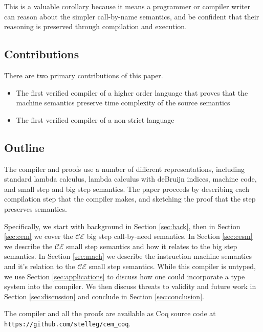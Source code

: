 This is a valuable corollary because it means a programmer or compiler writer
can reason about the simpler call-by-name semantics, and be confident that their
reasoning is preserved through compilation and execution.

\subsection{Contributions}
There are two primary contributions of this paper. 
\begin{itemize}
\item The first verified compiler of a higher order language that proves that
the machine semantics preserve time complexity of the source semantics
\item The first verified compiler of a non-strict language
\end{itemize}

\subsection{Outline}
The compiler and proofs use a number of different representations, including
standard lambda calculus, lambda calculus with deBruijn indices, machine
code, and small step and big step semantics. The paper proceeds by describing
each compilation step that the compiler makes, and sketching the proof that the
step preserves semantics.

Specifically, we start with background in Section \ref{sec:back}, then in
Section \ref{sec:cem} we cover the $\mathcal{CE}$ big step call-by-need
semantics. In Section \ref{sec:cesm} we describe the $\mathcal{CE}$ small step
semantics and how it relates to the big step semantics. In Section
\ref{sec:mach} we describe the instruction machine semantics and it's relation
to the $\mathcal{CE}$ small step semantics.  While this compiler is untyped, we
use Section \ref{sec:applications} to discuss how one could incorporate a type
system into the compiler. We then discuss threats to validity and future work in
Section \ref{sec:discussion} and conclude in Section \ref{sec:conclusion}. 

The compiler and all the proofs are available as Coq source code at
\texttt{https://github.com/stelleg/cem\_coq}.



